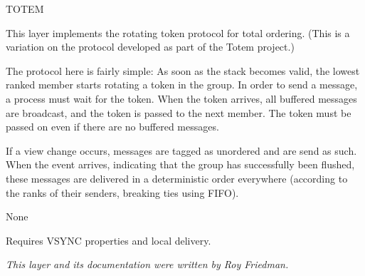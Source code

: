 \begin{Layer}{TOTEM}

This layer implements the rotating token protocol for total ordering.  (This is
a variation on the protocol developed as part of the Totem project.)

\begin{Protocol}
The protocol here is fairly simple: As soon as the stack becomes valid, the
lowest ranked member starts rotating a token in the group. In order to send a
message, a process must wait for the token. When the token arrives, all
buffered messages are broadcast, and the token is passed to the next member.
The token must be passed on even if there are no buffered messages.

If a view change occurs, messages are tagged as unordered and are send as
such.
When the  event arrives, indicating that the group has successfully
been flushed, these messages are delivered in a deterministic order everywhere
(according to the ranks of their senders, breaking ties using FIFO).
\end{Protocol}

\begin{Parameters}
\item None
\end{Parameters}

\begin{Properties}
\item
Requires VSYNC properties and local delivery.
\end{Properties}

\begin{Sources}
\end{Sources}

\begin{GenEvent}
\end{GenEvent}

\begin{Testing}
\item
\todo{}
\end{Testing}

\emph{This layer and its documentation were written by Roy Friedman.}
\end{Layer}
